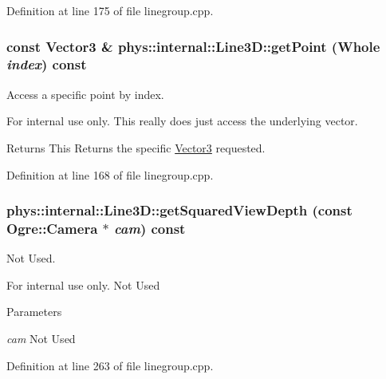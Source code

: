 Definition at line 175 of file linegroup.cpp.

\hypertarget{classphys_1_1internal_1_1Line3D_a190af0e38be28297ed2f6a7aecf0c316}{
\subsubsection[{getPoint}]{\setlength{\rightskip}{0pt plus 5cm}const {\bf Vector3} \& phys::internal::Line3D::getPoint ({\bf Whole} {\em index}) const}}
\label{d4/db5/classphys_1_1internal_1_1Line3D_a190af0e38be28297ed2f6a7aecf0c316}


Access a specific point by index. 

\begin{DoxyInternal}{For internal use only.}
This really does just access the underlying vector. \begin{DoxyReturn}{Returns}
This Returns the specific \hyperlink{classphys_1_1Vector3}{Vector3} requested. 
\end{DoxyReturn}
\end{DoxyInternal}


Definition at line 168 of file linegroup.cpp.

\hypertarget{classphys_1_1internal_1_1Line3D_a5d2622c10ef432e84cad59634dcee340}{
\subsubsection[{getSquaredViewDepth}]{ phys::internal::Line3D::getSquaredViewDepth (const Ogre::Camera $\ast$ {\em cam}) const}}
\label{d4/db5/classphys_1_1internal_1_1Line3D_a5d2622c10ef432e84cad59634dcee340}


Not Used. 

\begin{DoxyInternal}{For internal use only.}
Not Used 
\begin{DoxyParams}{Parameters}
\item[{\em cam}]Not Used \end{DoxyParams}
\end{DoxyInternal}


Definition at line 263 of file linegroup.cpp.

